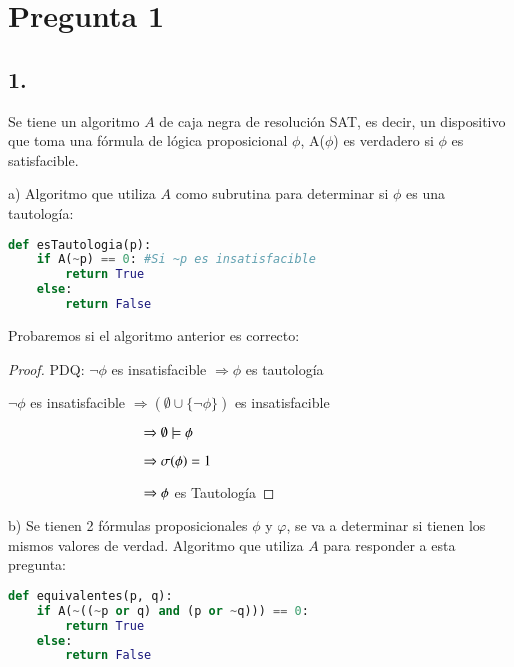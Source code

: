 \documentclass[
	spanish, %
	letterpaper, oneside
]{article}
\begin{document}
\templatePortrait

\templatePagecfg

\templateFinalcfg


\section*{Pregunta 1}
\subsection*{1.}
Se tiene un  algoritmo $A$ de caja negra de resolución SAT, es decir, un dispositivo que toma una fórmula de lógica proposicional $\phi$, A($\phi$) es verdadero si $\phi$ es satisfacible.


a) Algoritmo que utiliza $A$ como subrutina para determinar si $\phi$ es una tautología:

\begin{lstlisting}[language=Python]
def esTautologia(p):
    if A(~p) == 0: #Si ~p es insatisfacible
        return True
    else:
        return False
\end{lstlisting}
Probaremos si el algoritmo anterior es correcto:
\begin{proof}

    PDQ: $\neg \phi$ es insatisfacible $\Rightarrow \phi$ es tautología
    
    $\neg \phi$ es insatisfacible $\Rightarrow (\emptyset \cup \{\neg \phi\})$ es insatisfacible
    
    $\hspace{34mm} \Rightarrow \emptyset \models \phi$

    $\hspace{34mm} \Rightarrow \sigma(\phi) = 1$

    $\hspace{34mm} \Rightarrow \phi$ es Tautología
\end{proof}

b) Se tienen 2 fórmulas proposicionales $\phi$ y $\varphi$, se va a determinar si tienen los mismos valores de verdad. Algoritmo que utiliza $A$ para responder a esta pregunta:

\begin{lstlisting}[language=Python]
def equivalentes(p, q):
    if A(~((~p or q) and (p or ~q))) == 0:
        return True
    else:
        return False
\end{lstlisting}
\end{document}
